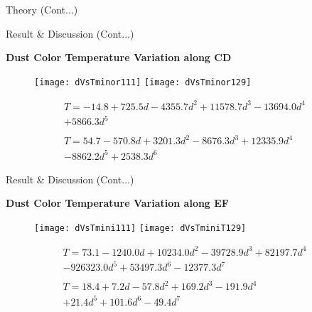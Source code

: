 \documentclass[12pt,a4paper]{beamer}
\begin{document}
\begin{frame}{Theory (Cont...)}
\begin{frame}{Result \& Discussion (Cont...)}
\begin{block}{\centering\textbf{Dust Color Temperature Variation along CD \vspace*{.05cm}}}
\begin{itemize}
\begin{figure}[h]
\vspace{0.0cm} \centering
\texttt{[image: dVsTminor111]}
\texttt{[image: dVsTminor129]}
\end{figure}
\begin{equation*}\label{LB}
\begin{array}{l}
T = -14.8 + 725.5d-4355.7d^{2} + 11578.7d^{3} - 13694.0d^{4}\\ + 5866.3d^{5}
\\
\\
T = 54.7 - 570.8d+3201.3d^{2} - 8676.3d^{3} + 12335.9d^{4}\\ - 8862.2d^{5} + 2538.3d^{6}
\end{array}
\end{equation*}
\end{itemize}
\end{block}
\end{frame}


\begin{frame}{Result \& Discussion (Cont...)}
\begin{block}{\centering\textbf{Dust Color Temperature Variation along EF \vspace*{.05cm}}}
\begin{itemize}
\begin{figure}[h]
\vspace{0.0cm} \centering
\texttt{[image: dVsTmini111]}
\texttt{[image: dVsTminiT129]}
\end{figure}
\begin{equation*}\label{LB}
\begin{array}{l}
T = 73.1 - 1240.0d + 10234.0d^{2} - 39728.9d^{3} + 82197.7d^{4}\\ - 926323.0d^{5} + 53497.3d^{6} - 12377.3d^{7}
\\
\\
T = 18.4+7.2d-57.8d^{2} + 169.2d^{3} - 191.9d^{4}\\ + 21.4d^{5} + 101.6d^{6} - 49.4d^{7}
\end{array}
\end{equation*}
\end{itemize}
\end{block}
\end{frame}


\end{frame}
\end{document}
